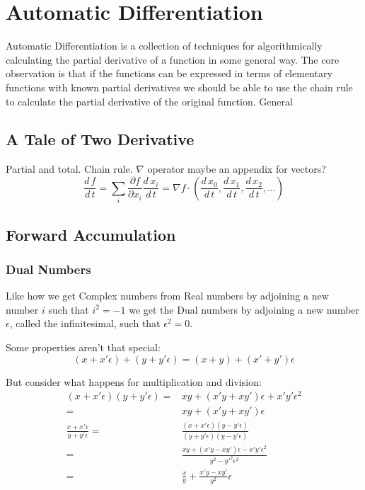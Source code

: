 
\chapter{Automatic Differentiation}
Automatic Differentiation is a collection of techniques for algorithmically calculating the partial derivative of a function in some general way.
The core observation is that if the functions can be expressed in terms of elementary functions with known partial derivatives we should be able to use the chain rule to calculate the partial derivative of the original function.
General

\section{A Tale of Two Derivative}
Partial and total.
Chain rule.
$\nabla$ operator maybe an appendix for vectors?
\[\frac{d\,f}{d\,t} = \sum_i \frac{\partial f}{\partial x_i}\frac{d\,x_i}{d\,t} = \nabla f \cdot \left(\frac{d\,x_0}{d\,t},\frac{d\,x_1}{d\,t},\frac{d\,x_2}{d\,t},\dots\right)\]

\section{Forward Accumulation}
\subsection{Dual Numbers}
Like how we get Complex numbers from Real numbers by adjoining a new number $i$ such that $i^2=-1$ we get the Dual numbers by adjoining a new number $\epsilon$, 
called the infinitesimal, 
such that $\epsilon^2 = 0$.

Some properties aren't that special:
\[(x+x'\epsilon) + (y+y'\epsilon) = (x+y)+(x'+y')\epsilon\]

But consider what happens for multiplication and division:
\begin{equation*}
\begin{aligned}
(x+x'\epsilon)(y+y'\epsilon) =& xy+(x'y+xy')\epsilon+x'y'\epsilon^2 \\
=& xy+(x'y+xy')\epsilon \\
\frac{x+x'\epsilon}{y+y'\epsilon} =& \frac{(x+x'\epsilon)(y-y'\epsilon)}{(y+y'\epsilon)(y-y'\epsilon)} \\
 =& \frac{xy+(x'y-xy')\epsilon-x'y'\epsilon^2}{y^2-y'^2\epsilon^2} \\
 =& \frac{x}{y}+\frac{x'y-xy'}{y^2}\epsilon \\
\end{aligned}
\end{equation*}

